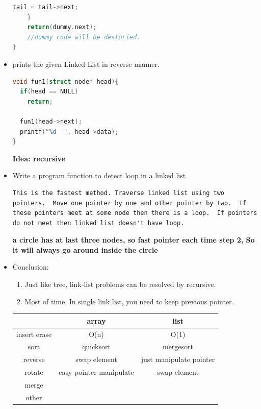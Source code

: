 \documentclass[a4paper,11pt,twoside]{book}
\begin{document}
\begin{itemize}
\begin{lstlisting}[frame=single, language=c++]
        tail = tail->next;
    }
    return(dummy.next);
    //dummy code will be destoried. 
}
 \end{lstlisting}


\item prints the given Linked List in reverse manner. 
\begin{lstlisting}[frame=single, language=c++]
void fun1(struct node* head){
  if(head == NULL)
    return;
  
  fun1(head->next);
  printf("%d  ", head->data);
}
\end{lstlisting}
\textbf{Idea: recursive}


\item Write a program function to detect loop in a linked list
\begin{lstlisting}[breaklines]
This is the fastest method. Traverse linked list using two pointers.  Move one pointer by one and other pointer by two.  If these pointers meet at some node then there is a loop.  If pointers do not meet then linked list doesn't have loop.
\end{lstlisting}
\textbf{a circle has at last three nodes, so fast pointer each time step 2, So it will always go around inside the circle}

\item Conclusion:
\begin{enumerate}
\item Just like tree, link-list problems can be resolved by recursive. 
\item Most of time, In single link list, you need to keep previous pointer. 
\end{enumerate}

\begin{tabular}{|c|c|c|}
\hline 
 & array & list \\ 
\hline 
insert erase & O(n) & O(1) \\ 
\hline 
sort & quicksort & mergesort  \\ 
\hline 
reverse & swap element & just manipulate pointer  \\ 
\hline 
rotate & easy pointer manipulate & swap element  \\ 
\hline 
merge &  &  \\ 
\hline 
other  &  &  \\ 
\hline 

\end{tabular} 


\end{itemize}
\end{document}
